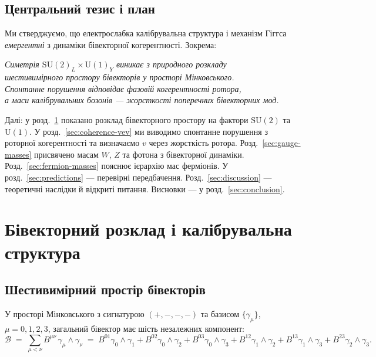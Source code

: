 \documentclass[11pt,a4paper]{article}
\newcommand{\Biv}{\mathcal{B}}
\newcommand{\SU}{\mathrm{SU}}
\newcommand{\UU}{\mathrm{U}}
\theoremstyle{definition}
\theoremstyle{plain}
\theoremstyle{remark}
\begin{document}
\subsection{Центральний тезис і план}

Ми стверджуємо, що електрослабка калібрувальна структура і механізм Гіггса \emph{емергентні} з динаміки бівекторної когерентності. Зокрема:

\begin{center}
\textit{Симетрія $\SU(2)_L \times \UU(1)_Y$ виникає з природного розкладу \\
шестивимірного простору бівекторів у просторі Мінковського. \\
Спонтанне порушення відповідає фазовій когерентності ротора, \\
а маси калібрувальних бозонів — жорсткості поперечних бівекторних мод.}
\end{center}

Далі: у розд.~\ref{sec:bivector-decomposition} показано розклад бівекторного простору на фактори $\SU(2)$ та $\UU(1)$. У розд.~\ref{sec:coherence-vev} ми виводимо спонтанне порушення з роторної когерентності та визначаємо $v$ через жорсткість ротора. Розд.~\ref{sec:gauge-masses} присвячено масам $W$, $Z$ та фотона з бівекторної динаміки. Розд.~\ref{sec:fermion-masses} пояснює ієрархію мас ферміонів. У розд.~\ref{sec:predictions} — перевірні передбачення. Розд.~\ref{sec:discussion} — теоретичні наслідки й відкриті питання. Висновки — у розд.~\ref{sec:conclusion}.

\vspace{1em}

\section{Бівекторний розклад і калібрувальна структура}\label{sec:bivector-decomposition}

\subsection{Шестивимірний простір бівекторів}

У просторі Мінковського з сигнатурою $(+,-,-,-)$ та базисом $\{\gamma_\mu\}$, $\mu=0,1,2,3$, загальний бівектор має шість незалежних компонент:
\begin{equation}
  \Biv \;=\; \sum_{\mu<\nu} B^{\mu\nu}\, \gamma_\mu \wedge \gamma_\nu
  \;=\; B^{01}\gamma_0\wedge\gamma_1 + B^{02}\gamma_0\wedge\gamma_2 + B^{03}\gamma_0\wedge\gamma_3
  + B^{12}\gamma_1\wedge\gamma_2 + B^{13}\gamma_1\wedge\gamma_3 + B^{23}\gamma_2\wedge\gamma_3.
\end{equation}
\end{document}
